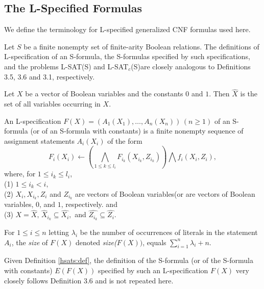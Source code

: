 \vspace*{-0.15in}
\subsection{The L-Specified Formulas}\label{sec:lspec}
We define the terminology for {\sf L-}specified generalized {\sf CNF} formulas used here. 

Let $S$ be a finite nonempty set of finite-arity Boolean 
relations. The definitions of L-specification of an S-formula, the 
S-formulas specified by such specifications, and the problems 
{\sf L-SAT(S)} and {\sf L-SAT}$_c${\sf (S)}are closely analogous to Definitions
3.5, 3.6 and 3.1, respectively.

\begin{definition}
Let $X$ be a vector of Boolean variables and the constants $0$ and $1$. Then
$\hat{X}$ is the set of all variables occurring in $X.$
\end{definition}

\begin{definition}\label{hsats:def}
An {\sf L-}specification $F(X) = (A_1(X_1),\ldots, A_n(X_n))\, (n \geq 1)$ 
of an S-formula (or of an S-formula with constants) is a finite nonempty 
sequence of assignment statements $A_i(X_i)$ of the form 
\[ F_i(X_i) \leftarrow 
(\bigwedge_{1 \leq k \leq  l_i} F_{i_k}(X_{i_k},Z_{i_k})) \bigwedge 
f_i(X_i,Z_i), \]
where, for $1 \leq i_k \leq l_i$,\\
(1) $1 \leq i_k < i,$ \\
(2) $X_i, X_{i_k}, Z_i$ and $Z_{i_k}$ are vectors of Boolean variables(or are 
vectors of Boolean variables, $0$, and $1$, respectively. and \\
(3) $X = \hat{X}, \, \hat{X}_{i_k} \subseteq \hat{X_i},$ and $ \hat{Z_{i_k}} 
\subseteq \hat{Z_i}$. 

\noindent
For $1 \leq i \leq n$ letting $\lambda_i$ be the number of occurrences of
literals in the statement $A_i$, the {\em size} of $F(X)$ denoted 
{\em size($F(X))$}, equals $\sum_{i=1}^{n} \lambda_i + n$.
\end{definition}

Given Definition \ref{hsats:def}, the definition of the 
{\sf S-formula} (or of the {\sf S}-formula with constants) 
$E(F(X))$ specified
by such an  L-specification $F(X)$ very closely follows Definition 3.6 and 
is not repeated here. 





